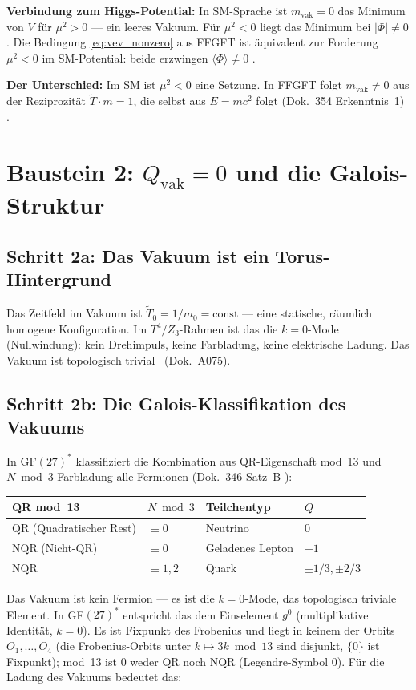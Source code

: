 \textbf{Verbindung zum Higgs-Potential:} In SM-Sprache ist $m_\text{vak}=0$ das
Minimum von $V$ für $\mu^2>0$ --- ein leeres Vakuum. Für $\mu^2<0$ liegt das
Minimum bei $|\Phi|\neq0$. Die Bedingung \eqref{eq:vev_nonzero} aus FFGFT ist
äquivalent zur Forderung $\mu^2<0$ im SM-Potential: beide erzwingen
$\langle\Phi\rangle\neq0$ \BM.

\textbf{Der Unterschied:} Im SM ist $\mu^2<0$ eine Setzung.
In FFGFT folgt $m_\text{vak}\neq0$ aus der Reziprozität $\tilde{T}\cdot m=1$,
die selbst aus $E=mc^2$ folgt (Dok.~354 Erkenntnis~1) \BM.

\section{Baustein 2: $Q_\text{vak} = 0$ und die Galois-Struktur}

\subsection*{Schritt 2a: Das Vakuum ist ein Torus-Hintergrund}

Das Zeitfeld im Vakuum ist $\tilde{T}_0 = 1/m_0 = \text{const}$ --- eine
statische, räumlich homogene Konfiguration. Im $T^4/Z_3$-Rahmen ist das die
$k=0$-Mode (Nullwindung): kein Drehimpuls, keine Farbladung, keine
elektrische Ladung. Das Vakuum ist topologisch trivial \BM\ (Dok.~A075).

\subsection*{Schritt 2b: Die Galois-Klassifikation des Vakuums}

In GF$(27)^*$ klassifiziert die Kombination aus QR-Eigenschaft mod~13
und $N\bmod3$-Farbladung alle Fermionen (Dok.~346 Satz~B \BM):

\begin{center}
\begin{tabular}{@{}llll@{}}
\toprule
QR mod~13 & $N\bmod3$ & Teilchentyp & $Q$ \\
\midrule
QR (Quadratischer Rest) & $\equiv 0$ & Neutrino & $0$ \\
NQR (Nicht-QR) & $\equiv 0$ & Geladenes Lepton & $-1$ \\
NQR & $\equiv 1,2$ & Quark & $\pm1/3,\pm2/3$ \\
\bottomrule
\end{tabular}
\end{center}

Das Vakuum ist kein Fermion --- es ist die $k=0$-Mode, das topologisch triviale
Element. In GF$(27)^*$ entspricht das dem Einselement $g^0$ (multiplikative
Identität, $k = 0$). Es ist Fixpunkt des Frobenius und liegt in keinem der
Orbits $O_1,\dots,O_4$ (die Frobenius-Orbits unter $k \mapsto 3k \bmod 13$ sind
disjunkt, $\{0\}$ ist Fixpunkt); mod~13 ist $0$ weder QR noch NQR
(Legendre-Symbol $0$). Für die Ladung des Vakuums bedeutet das:

